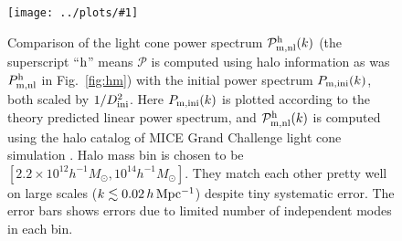 \documentclass[prd,amsmath,amssymb,floatfix,superscriptaddress,nofootinbib,twocolumn]{revtex4-1}
\newcommand{\ini}{\rm ini}
\newcommand{\rf}[1]{\ref{fig:#1}}
\newcommand{\sfig}[2]{
\texttt{[image: ../plots/\#1]}
        }
\newcommand{\Sfig}[2]{
   \begin{figure}[thbp]
   \begin{center}
    \sfig{../plots/#1.pdf}{\columnwidth}
    \caption{{\small #2}}
    \label{fig:#1}
     \end{center}
   \end{figure}
}
\begin{document}
\Sfig{psLC}{Comparison of the light cone power spectrum $\mathcal{P}_{\rm m,nl}^{\rm h}(k)$ (the superscript ``$\rm h$'' means $\mathcal{P}$ is computed using halo information as was $P_{\rm m,nl}^{\rm h}$ in Fig.~\rf{hm}) with the initial power spectrum $P_{\rm m,ini}(k)$, both scaled by $1/D_{\ini}^{2}$. Here $P_{\rm m,ini}(k)$ is plotted according to the theory predicted linear power spectrum, and $\mathcal{P}_{\rm m,nl}^{\rm h}(k)$ is computed using the halo catalog of MICE Grand Challenge light cone simulation \cite{Fosalba:2015MI}\cite{Fosalba:2015MII}. Halo mass bin is chosen to be $[2.2 \times 10^{12}h^{-1}M_{\odot},10^{14}h^{-1}M_{\odot}]$. They match each other pretty well on large scales ($k\lesssim 0.02 \,h\,\rm Mpc^{-1}$) despite tiny systematic error. The error bars shows errors due to limited number of independent modes in each bin.}
\end{document}
